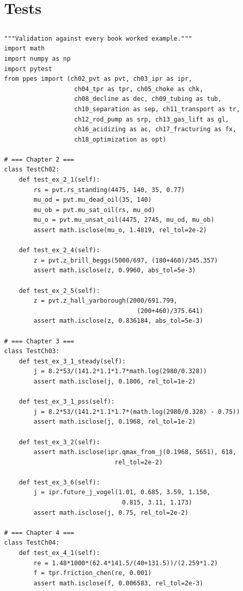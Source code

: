 \documentclass[10pt,a4paper,openany]{book}
\begin{document}
\part{Tests}

\chapter{}
\begin{lstlisting}
"""Validation against every book worked example."""
import math
import numpy as np
import pytest
from ppes import (ch02_pvt as pvt, ch03_ipr as ipr,
                   ch04_tpr as tpr, ch05_choke as chk,
                   ch08_decline as dec, ch09_tubing as tub,
                   ch10_separation as sep, ch11_transport as tr,
                   ch12_rod_pump as srp, ch13_gas_lift as gl,
                   ch16_acidizing as ac, ch17_fracturing as fx,
                   ch18_optimization as opt)

# === Chapter 2 ===
class TestCh02:
    def test_ex_2_1(self):
        rs = pvt.rs_standing(4475, 140, 35, 0.77)
        mu_od = pvt.mu_dead_oil(35, 140)
        mu_ob = pvt.mu_sat_oil(rs, mu_od)
        mu_o = pvt.mu_unsat_oil(4475, 2745, mu_od, mu_ob)
        assert math.isclose(mu_o, 1.4819, rel_tol=2e-2)

    def test_ex_2_4(self):
        z = pvt.z_brill_beggs(5000/697, (180+460)/345.357)
        assert math.isclose(z, 0.9960, abs_tol=5e-3)

    def test_ex_2_5(self):
        z = pvt.z_hall_yarborough(2000/691.799,
                                    (200+460)/375.641)
        assert math.isclose(z, 0.836184, abs_tol=5e-3)

# === Chapter 3 ===
class TestCh03:
    def test_ex_3_1_steady(self):
        j = 8.2*53/(141.2*1.1*1.7*math.log(2980/0.328))
        assert math.isclose(j, 0.1806, rel_tol=1e-2)

    def test_ex_3_1_pss(self):
        j = 8.2*53/(141.2*1.1*1.7*(math.log(2980/0.328) - 0.75))
        assert math.isclose(j, 0.1968, rel_tol=1e-2)

    def test_ex_3_2(self):
        assert math.isclose(ipr.qmax_from_j(0.1968, 5651), 618,
                              rel_tol=2e-2)

    def test_ex_3_6(self):
        j = ipr.future_j_vogel(1.01, 0.685, 3.59, 1.150,
                                0.815, 3.11, 1.173)
        assert math.isclose(j, 0.75, rel_tol=2e-2)

# === Chapter 4 ===
class TestCh04:
    def test_ex_4_1(self):
        re = 1.48*1000*(62.4*141.5/(40+131.5))/(2.259*1.2)
        f = tpr.friction_chen(re, 0.001)
        assert math.isclose(f, 0.006583, rel_tol=2e-3)


\end{lstlisting}
\end{document}
